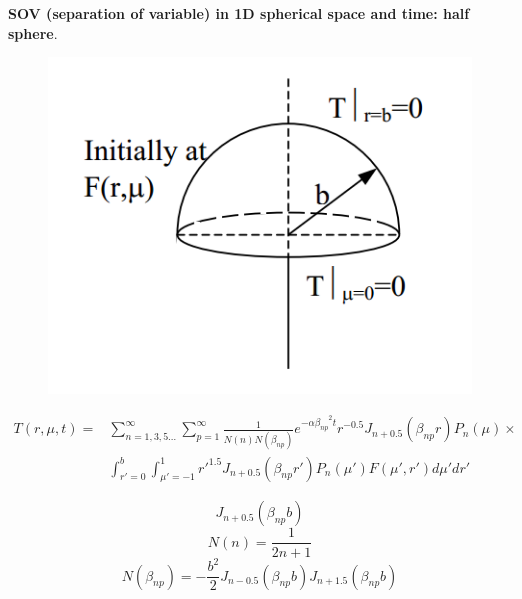 \begin{appendices}
\begin{example}
\textbf{SOV (separation of variable) in 1D spherical space and time: half sphere}. 
\begin{figure}[H]
  \centering
    \includegraphics[scale=0.5]{figures/appendixA/8}
\end{figure}
\begin{equation*}
\begin{aligned}
T(r,\mu,t)=&\sum_{n=1,3,5\dots}^{\infty}\sum_{p=1}^{\infty} \frac{1}{N(n)N(\beta_{np})}
e^{-\alpha{\beta_{np}}^2t}r^{-0.5}J_{n+0.5}(\beta_{np}r)P_n(\mu)\times\\
&\int_{r'=0}^{b}\int_{\mu'=-1}^{1} {r'}^{1.5}J_{n+0.5}(\beta_{np}r')P_n(\mu')
F(\mu',r')d\mu'dr'
\end{aligned}
\end{equation*}

$$J_{n+0.5}(\beta_{np}b)$$
$$N(n)=\frac{1}{2n+1}$$
$$N(\beta_{np})=-\frac{b^2}{2}J_{n-0.5}(\beta_{np}b)J_{n+1.5}(\beta_{np}b)$$
\end{example}


\end{appendices}
